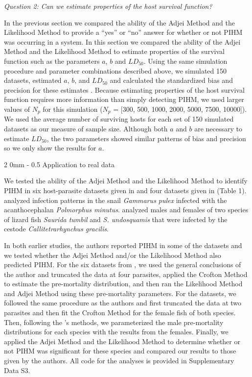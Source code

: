 \documentclass[12pt, a4paper]{article}
\makeatletter
\renewcommand{\subsection}{\@startsection
{subsection}%
{2}%
{0mm}%
{-\baselineskip}%
{0.5\baselineskip}%
{\normalfont\bf}} %
\makeatother
\begin{document}
\noindent
\emph{Question 2: Can we estimate properties of the host survival function?}

In the previous section we compared the ability of the Adjei Method and the Likelihood Method to provide a ``yes'' or ``no'' answer for whether or not PIHM was occurring in a system. In this section we compared the ability of the Adjei Method and the Likelihood Method to estimate properties of the survival function such as the parameters $a$, $b$ and $LD_{50}$.  Using the same simulation procedure and parameter combinations described above, we simulated 150 datasets, estimated $a$, $b$, and $LD_{50}$ and calculated the standardized bias and
precision for these estimates \citep{Walther2005}.  Because estimating properties of the host survival function requires more information than simply detecting PIHM, we used larger values of $N_p$ for this simulation ($N_p$ = [300, 500, 1000, 2000, 5000, 7500,
10000]).  We used the average number of surviving hosts for each set of 150 simulated datasets as our measure of sample size.  Although both $a$ and $b$ are necessary to estimate $LD_{50}$, the two parameters showed similar patterns of bias and precision so we only show the results for $a$.

\subsection{Application to real data}

We tested the ability of the Adjei Method and the Likelihood Method to identify
PIHM in six host-parasite datasets given in \cite{Crofton1971a} and four datasets
given in \cite{Adjei1986} (Table 1). \citeauthor{Crofton1971a} analyzed infection patterns in the snail \emph{Gammarus pulex} infected with the
acanthocephalan \emph{Polmorphus minutus}. \citeauthor{Adjei1986} analyzed males and females of two species of lizard fish \emph{Saurida tumbil} and
\emph{S. undosquamis} that were infected by the cestode
\emph{Callitetrarhynchus gracilis}.

In both earlier studies, the authors reported PIHM in some of the datasets and we tested whether the Adjei
Method and/or the Likelihood Method also predicted PIHM. For the six datasets from
\cite{Crofton1971a}, we used the general conclusions of the author and truncated the data at four parasites, applied the Crofton
Method to estimate the pre-mortality distribution, and then ran the Likelihood
Method and Adjei Method using these pre-mortality parameters.  For the
\cite{Adjei1986} datasets, we followed the same procedure as the authors and
first truncated the data at two parasites and then fit the Crofton Method for the
female fish of both species.  Then, following the \citeauthor{Adjei1986}'s methods, we parameterized the male pre-mortality
distributions for each species with the results from the females.  Finally, we
applied the Adjei Method and the Likelihood Method to determine whether or not
PIHM was significant for these species and compared our results to those given by the authors.  All code for the analyses is provided in Supplementary Data S3.
\end{document}
